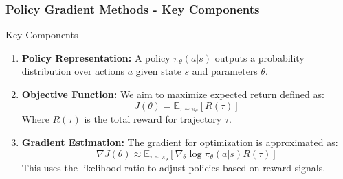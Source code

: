 \documentclass[aspectratio=169]{beamer}
\begin{document}
\begin{frame}[fragile]
    \frametitle{Policy Gradient Methods - Key Components}
    \begin{block}{Key Components}
        \begin{enumerate}
            \item \textbf{Policy Representation:} A policy \( \pi_\theta(a|s) \) outputs a probability distribution over actions \( a \) given state \( s \) and parameters \( \theta \).
            
            \item \textbf{Objective Function:} We aim to maximize expected return defined as:
            \begin{equation}
                J(\theta) = \mathbb{E}_{\tau \sim \pi_\theta} \left[ R(\tau) \right]
            \end{equation}
            Where \( R(\tau) \) is the total reward for trajectory \( \tau \).
            
            \item \textbf{Gradient Estimation:} The gradient for optimization is approximated as:
            \begin{equation}
                \nabla J(\theta) \approx \mathbb{E}_{\tau \sim \pi_\theta} \left[ \nabla_\theta \log \pi_\theta(a|s) R(\tau) \right]
            \end{equation}
            This uses the likelihood ratio to adjust policies based on reward signals.
        \end{enumerate}
    \end{block}
\end{frame}
\end{document}

